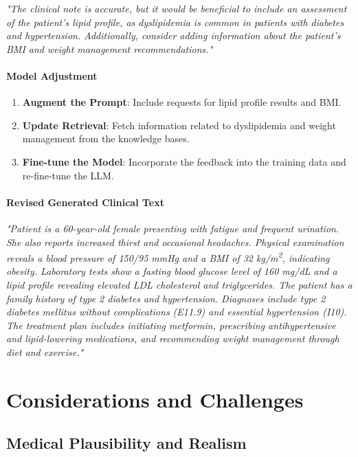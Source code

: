 \documentclass[12pt, a4paper]{article}
\begin{document}
\textit{"The clinical note is accurate, but it would be beneficial to include an assessment of the patient's lipid profile, as dyslipidemia is common in patients with diabetes and hypertension. Additionally, consider adding information about the patient's BMI and weight management recommendations."}

\paragraph{Model Adjustment}

\begin{enumerate}
    \item \textbf{Augment the Prompt}: Include requests for lipid profile results and BMI.
    \item \textbf{Update Retrieval}: Fetch information related to dyslipidemia and weight management from the knowledge bases.
    \item \textbf{Fine-tune the Model}: Incorporate the feedback into the training data and re-fine-tune the LLM.
\end{enumerate}

\paragraph{Revised Generated Clinical Text}

\textit{"Patient is a 60-year-old female presenting with fatigue and frequent urination. She also reports increased thirst and occasional headaches. Physical examination reveals a blood pressure of 150/95 mmHg and a BMI of 32 kg/m\textsuperscript{2}, indicating obesity. Laboratory tests show a fasting blood glucose level of 160 mg/dL and a lipid profile revealing elevated LDL cholesterol and triglycerides. The patient has a family history of type 2 diabetes and hypertension. Diagnoses include type 2 diabetes mellitus without complications (E11.9) and essential hypertension (I10). The treatment plan includes initiating metformin, prescribing antihypertensive and lipid-lowering medications, and recommending weight management through diet and exercise."}

\section{Considerations and Challenges}

\subsection{Medical Plausibility and Realism}
\end{document}
